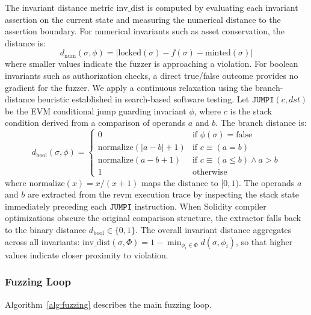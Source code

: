 \documentclass[journal]{IEEEtran}
\begin{document}
The invariant distance metric $\text{inv\_dist}$ is computed by evaluating each invariant assertion on the current state and measuring the numerical distance to the assertion boundary. For numerical invariants such as asset conservation, the distance is:
\begin{equation}
    d_{\text{num}}(\sigma, \phi) = |\text{locked}(\sigma) - f(\sigma) - \text{minted}(\sigma)|
\end{equation}
where smaller values indicate the fuzzer is approaching a violation. For boolean invariants such as authorization checks, a direct true/false outcome provides no gradient for the fuzzer. We apply a continuous relaxation using the branch-distance heuristic established in search-based software testing. Let $\texttt{JUMPI}(c, \textit{dst})$ be the EVM conditional jump guarding invariant $\phi$, where $c$ is the stack condition derived from a comparison of operands $a$ and $b$. The branch distance is:
\begin{equation}
    d_{\text{bool}}(\sigma, \phi) = \begin{cases}
        0 & \text{if } \phi(\sigma) = \text{false} \\
        \text{normalize}(|a - b| + 1) & \text{if } c \equiv (a = b) \\
        \text{normalize}(a - b + 1) & \text{if } c \equiv (a \leq b) \wedge a > b \\
        1 & \text{otherwise}
    \end{cases}
\end{equation}
where $\text{normalize}(x) = x / (x + 1)$ maps the distance to $[0, 1)$. The operands $a$ and $b$ are extracted from the revm execution trace by inspecting the stack state immediately preceding each $\texttt{JUMPI}$ instruction. When Solidity compiler optimizations obscure the original comparison structure, the extractor falls back to the binary distance $d_{\text{bool}} \in \{0, 1\}$. The overall invariant distance aggregates across all invariants: $\text{inv\_dist}(\sigma, \Phi) = 1 - \min_{\phi_i \in \Phi} d(\sigma, \phi_i)$, so that higher values indicate closer proximity to violation.

\subsubsection{Fuzzing Loop}

Algorithm~\ref{alg:fuzzing} describes the main fuzzing loop.
\end{document}
